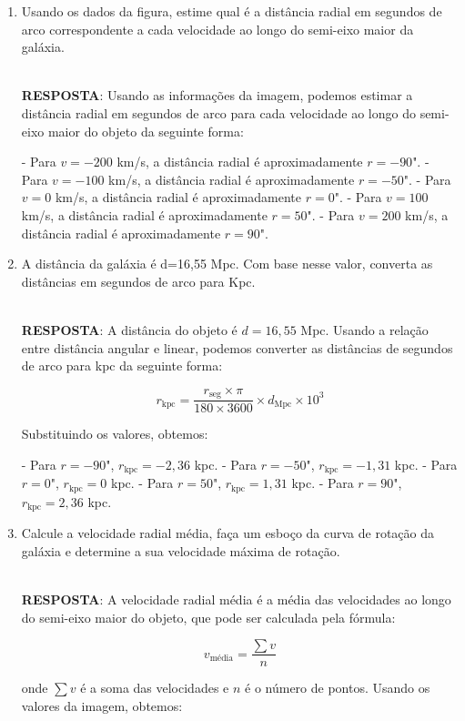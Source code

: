 \documentclass[a4paper,12pt]{article}
\begin{document}
\begin{enumerate}
\begin{enumerate}
\item Usando os dados da figura, estime qual é a distância radial em segundos de arco correspondente a cada velocidade ao longo do semi-eixo maior da galáxia.

\noindent\hrulefill\\\textbf{RESPOSTA}: Usando as informações da imagem, podemos estimar a distância radial em segundos de arco para cada velocidade ao longo do semi-eixo maior do objeto da seguinte forma:

- Para $v = -200$ km/s, a distância radial é aproximadamente $r = -90$".
- Para $v = -100$ km/s, a distância radial é aproximadamente $r = -50$".
- Para $v = 0$ km/s, a distância radial é aproximadamente $r = 0$".
- Para $v = 100$ km/s, a distância radial é aproximadamente $r = 50$".
- Para $v = 200$ km/s, a distância radial é aproximadamente $r = 90$".

\noindent\hrulefill

\item A distância da galáxia é d=16,55 Mpc. Com base nesse valor, converta as distâncias em segundos de arco para Kpc.

\noindent\hrulefill\\\textbf{RESPOSTA}: A distância do objeto é $d = 16,55$ Mpc. Usando a relação entre distância angular e linear, podemos converter as distâncias de segundos de arco para kpc da seguinte forma:

$$r_{\text{kpc}} = \frac{r_{\text{seg}} \times \pi}{180 \times 3600} \times d_{\text{Mpc}} \times 10^3$$

Substituindo os valores, obtemos:

- Para $r = -90$", $r_{\text{kpc}} = -2,36$ kpc.
- Para $r = -50$", $r_{\text{kpc}} = -1,31$ kpc.
- Para $r = 0$", $r_{\text{kpc}} = 0$ kpc.
- Para $r = 50$", $r_{\text{kpc}} = 1,31$ kpc.
- Para $r = 90$", $r_{\text{kpc}} = 2,36$ kpc.

\noindent\hrulefill

\item Calcule a velocidade radial média, faça um esboço da curva de rotação da galáxia e determine a sua velocidade máxima de rotação.

\noindent\hrulefill\\\textbf{RESPOSTA}: A velocidade radial média é a média das velocidades ao longo do semi-eixo maior do objeto, que pode ser calculada pela fórmula:

$$v_{\text{média}} = \frac{\sum v}{n}$$

onde $\sum v$ é a soma das velocidades e $n$ é o número de pontos. Usando os valores da imagem, obtemos:


\end{enumerate}
\end{enumerate}
\end{document}
